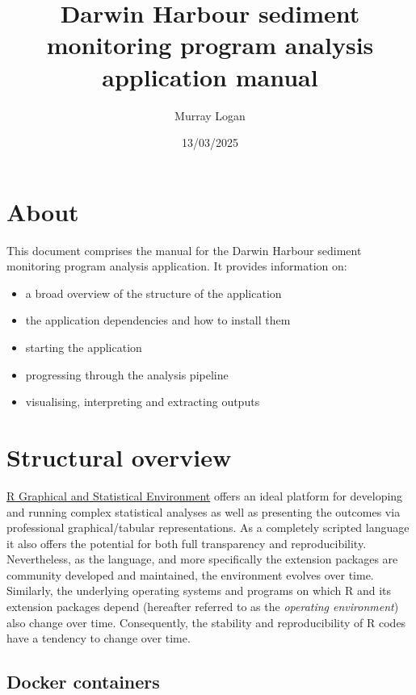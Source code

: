 \documentclass[
  8pt,
  a4paper]{article}
\title{Darwin Harbour sediment monitoring program analysis application
manual}
\author{Murray Logan}
\date{13/03/2025}
\providecommand{\tightlist}{%
  \setlength{\itemsep}{0pt}\setlength{\parskip}{0pt}}\usepackage{longtable,booktabs,array}
\renewcommand*\contentsname{Table of contents}
\newcommand\contentsname{Table of contents}
\begin{document}
\maketitle

\renewcommand*\contentsname{Table of contents}
{
\hypersetup{linkcolor=}
\setcounter{tocdepth}{3}
\tableofcontents
}

\section{About}\label{about}

This document comprises the manual for the Darwin Harbour sediment
monitoring program analysis application. It provides information on:

\begin{itemize}
\tightlist
\item
  a broad overview of the structure of the application
\item
  the application dependencies and how to install them
\item
  starting the application
\item
  progressing through the analysis pipeline
\item
  visualising, interpreting and extracting outputs
\end{itemize}

\section{Structural overview}\label{structural-overview}

\href{https://www.r-project.org/}{R Graphical and Statistical
Environment} offers an ideal platform for developing and running complex
statistical analyses as well as presenting the outcomes via professional
graphical/tabular representations. As a completely scripted language it
also offers the potential for both full transparency and
reproducibility. Nevertheless, as the language, and more specifically
the extension packages are community developed and maintained, the
environment evolves over time. Similarly, the underlying operating
systems and programs on which R and its extension packages depend
(hereafter referred to as the \emph{operating environment}) also change
over time. Consequently, the stability and reproducibility of R codes
have a tendency to change over time.

\subsection{Docker containers}\label{docker-containers}
\end{document}
